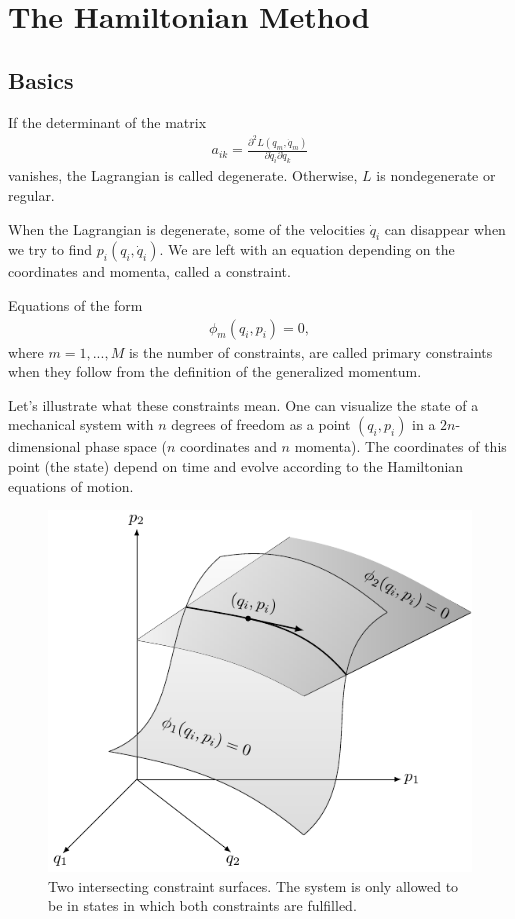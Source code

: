 \chapter{The Hamiltonian Method}
\section{Basics}
\begin{definition}
If the determinant of the matrix 
\begin{align}
a_{ik} = \frac{\partial^2 L(q_m,\dot{q}_m)}{\partial \dot{q}_i \partial \dot{q}_k}
\end{align}
vanishes, the Lagrangian is called degenerate. Otherwise, $L$ is nondegenerate or regular.
\end{definition}
When the Lagrangian is degenerate, some of the velocities $\dot{q}_i$ can disappear when we try to find $p_i(q_i,\dot{q}_i)$. We are left with an equation depending on the coordinates and momenta, called a constraint.
\begin{definition}
Equations of the form
\begin{align}
\phi_m(q_i,p_i) = 0, 
\end{align}
where $m = 1, ..., M$ is the number of constraints, are called primary constraints when they follow from the definition of the generalized momentum.
\end{definition}
Let's illustrate what these constraints mean. One can visualize the state of a mechanical system with $n$ degrees of freedom as a point $(q_i,p_i)$ in a $2n$-dimensional phase space ($n$ coordinates and $n$ momenta). The coordinates of this point (the state) depend on time and evolve according to the Hamiltonian equations of motion. 
\begin{figure}[H]
\begin{center}
\includegraphics[scale=1.28]{img/constraint.pdf}
\end{center}
\caption{Two intersecting constraint surfaces. The system is only allowed to be in states in which both constraints are fulfilled.}
\label{fig:1}
\end{figure}
